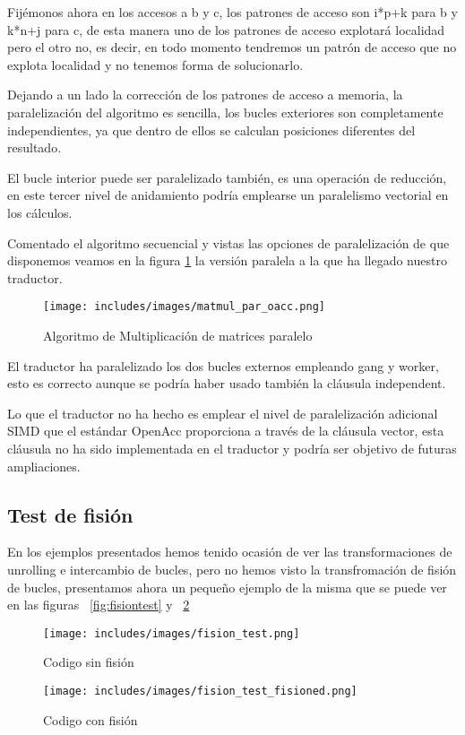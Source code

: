 Fijémonos ahora en los accesos a b y c, los patrones de acceso son i*p+k para b y k*n+j para c, de esta manera uno de los patrones de acceso explotará localidad pero el otro no, es decir, en todo momento tendremos un patrón de acceso que no explota localidad y no tenemos forma de solucionarlo.

Dejando a un lado la corrección de los patrones de acceso a memoria, la paralelización del algoritmo es sencilla, los bucles exteriores son completamente independientes, ya que dentro de ellos se calculan posiciones diferentes del resultado.

El bucle interior puede ser paralelizado también, es una operación de reducción, en este tercer nivel de anidamiento podría emplearse un paralelismo vectorial en los cálculos.

Comentado el algoritmo secuencial y vistas las opciones de paralelización de que disponemos veamos en la figura \ref{fig:Matmulpar} la versión paralela a la que ha llegado nuestro traductor.

\begin{figure}[t]
\centering
\texttt{[image: includes/images/matmul\_par\_oacc.png]}
\caption{Algoritmo de Multiplicación de matrices paralelo}
\label{fig:Matmulpar}
\end{figure}

El traductor ha paralelizado los dos bucles externos empleando gang y worker, esto es correcto aunque se podría haber usado también la cláusula independent.

Lo que el traductor no ha hecho es emplear el nivel de paralelización adicional SIMD que el estándar OpenAcc proporciona a través de la cláusula vector, esta cláusula no ha sido implementada en el traductor y podría ser objetivo de futuras ampliaciones.


\subsection{Test de fisión}

En los ejemplos presentados hemos tenido ocasión de ver las transformaciones de unrolling e intercambio de bucles, pero no hemos visto la transfromación de fisión de bucles, presentamos ahora un pequeño ejemplo de la misma que se puede ver en las figuras ~\ref{fig:fisiontest} y ~\ref{fig:fisiontestfisioned}
%
%
\begin{figure}[tph]
\centering

\begin{minipage}{0.30\textwidth}
\texttt{[image: includes/images/fision\_test.png]}
\caption{Codigo sin fisión}
\label{fig:fisiontest}
\end{minipage}
\hspace*{1cm}
\begin{minipage}{0.35\textwidth}
\texttt{[image: includes/images/fision\_test\_fisioned.png]}
\caption{Codigo con fisión}
\label{fig:fisiontestfisioned}
\end{minipage}

\end{figure}
%

